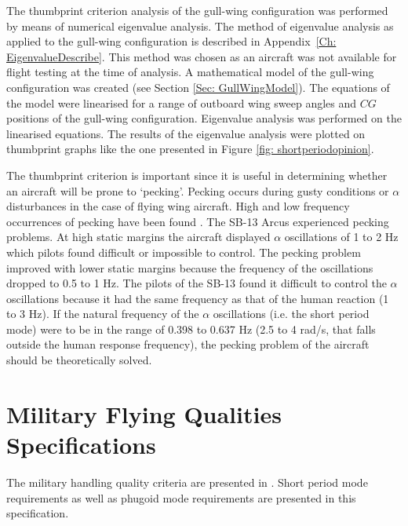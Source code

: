 \documentclass{report}
\begin{document}
The thumbprint criterion analysis of the gull-wing configuration was performed by means of numerical eigenvalue analysis.  The method of eigenvalue analysis as applied to the gull-wing configuration is described in \mbox{Appendix \ref{Ch: EigenvalueDescribe}}.  This method was chosen as an aircraft was not available for flight testing at the time of analysis.  A mathematical model of the gull-wing configuration was created (see Section \ref{Sec: GullWingModel}).  The equations of the model were linearised for a range of outboard wing sweep angles and $CG$ positions of the gull-wing configuration.  Eigenvalue analysis was performed on the linearised equations.  The results of the eigenvalue analysis were plotted on thumbprint graphs like the one presented in Figure \ref{fig: shortperiodopinion}.  

The thumbprint criterion is important since it is useful in determining whether an aircraft will be prone to `pecking'.   Pecking occurs during gusty conditions or $\alpha$ disturbances in the case of flying wing aircraft.  High and low frequency occurrences of pecking have been found \citep{ECNpuntboek}.  The SB-13 Arcus experienced pecking problems.  At high static margins the aircraft displayed $\alpha$ oscillations of 1 to 2 Hz which pilots found difficult or impossible to control.  The pecking problem improved with lower static margins because the frequency of the oscillations dropped to 0.5 to 1 Hz.  The pilots of the SB-13 found it difficult to control the $\alpha$ oscillations because it had the same frequency as that of the human reaction (1 to 3 Hz).  If the natural frequency of the $\alpha$ oscillations (i.e. the short period mode) were to be in the range of 0.398 to 0.637 Hz (2.5 to 4 rad/s, that falls outside the human response frequency), the pecking problem of the aircraft should be theoretically solved.  

\section{Military Flying Qualities Specifications}\label{Sec: MilFlyQualMethod}


The military handling quality criteria are presented in \cite{MILF8785C}.  Short period mode requirements as well as phugoid mode requirements are presented in this specification. 
\end{document}
